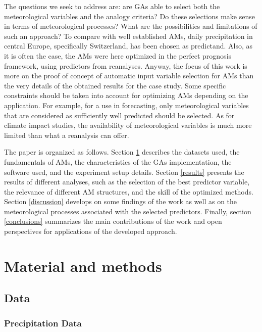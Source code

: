 \documentclass[draft]{agujournal2019}
\begin{document}
The questions we seek to address are: are GAs able to select both the meteorological variables and the analogy criteria? Do these selections make sense in terms of meteorological processes? What are the possibilities and limitations of such an approach? To compare with well established AMs, daily precipitation in central Europe, specifically Switzerland, has been chosen as predictand. Also, as it is often the case, the AMs were here optimized in the perfect prognosis framework, using predictors from reanalyses. Anyway, the focus of this work is more on the proof of concept of automatic input variable selection for AMs than the very details of the obtained results for the case study. Some specific constraints should be taken into account for optimizing AMs depending on the application. For example, for a use in forecasting, only meteorological variables that are considered as sufficiently well predicted should be selected. As for climate impact studies, the availability of meteorological variables is much more limited than what a reanalysis can offer.

The paper is organized as follows. Section \ref{material_methods} describes the datasets used, the fundamentals of AMs, the characteristics of the GAs implementation, the software used, and the experiment setup details. Section \ref{results} presents the results of different analyses, such as the selection of the best predictor variable, the relevance of different AM structures, and the skill of the optimized methods. Section \ref{discussion} develops on some findings of the work as well as on the meteorological processes associated with the selected predictors. Finally, section \ref{conclusions} summarizes the main contributions of the work and open perspectives for applications of the developed approach.



\section{Material and methods}
\label{material_methods}

\subsection{Data}
\label{data}

\subsubsection{Precipitation Data}
\label{precip}
\end{document}
